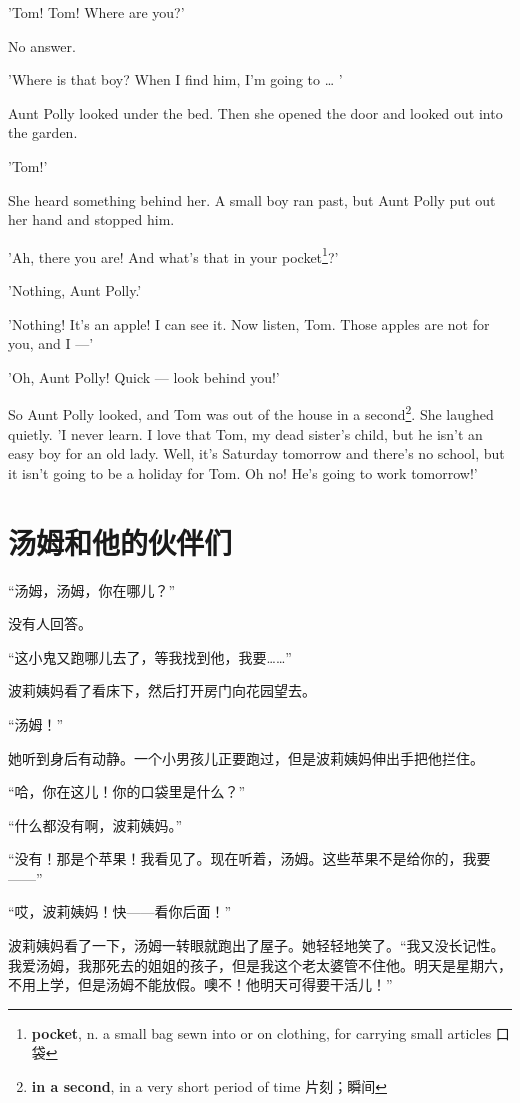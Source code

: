 \documentclass[fontset=ubuntu, zihao=5]{ctexart}
\begin{document}
\begin{paracol}{2}
'Tom! Tom! Where are you?'

No answer.

'Where is that boy? When I find him, I'm going to \ldots{} '

Aunt Polly looked under the bed. Then she opened the door and looked out into the garden.

'Tom!'

She heard something behind her. A small boy ran past, but Aunt Polly put out her hand and stopped him.

'Ah, there you are! And what's that in your pocket\footnote{\textbf{pocket}, n. a small bag sewn into or on clothing, for carrying small articles 口袋}?'

'Nothing, Aunt Polly.'

'Nothing! It's an apple! I can see it. Now listen, Tom. Those apples are not for you, and I —'

'Oh, Aunt Polly! Quick — look behind you!'

So Aunt Polly looked, and Tom was out of the house in a second\footnote{\textbf{in a
  second}, in a very short period of time 片刻；瞬间}. She laughed quietly. 'I
never learn. I love that Tom, my dead sister's child, but he isn't an easy
boy for an old lady. Well, it's Saturday tomorrow and there's no school, but
it isn't going to be a holiday for Tom. Oh no! He's going to work tomorrow!'

\switchcolumn

\section*{汤姆和他的伙伴们}

“汤姆，汤姆，你在哪儿？”

没有人回答。

“这小鬼又跑哪儿去了，等我找到他，我要……”

波莉姨妈看了看床下，然后打开房门向花园望去。

“汤姆！”

她听到身后有动静。一个小男孩儿正要跑过，但是波莉姨妈伸出手把他拦住。

“哈，你在这儿！你的口袋里是什么？”

“什么都没有啊，波莉姨妈。”

“没有！那是个苹果！我看见了。现在听着，汤姆。这些苹果不是给你的，我要——”

“哎，波莉姨妈！快——看你后面！”

波莉姨妈看了一下，汤姆一转眼就跑出了屋子。她轻轻地笑了。“我又没长记性。我爱汤姆，我那死去的姐姐的孩子，但是我这个老太婆管不住他。明天是星期六，不用上学，但是汤姆不能放假。噢不！他明天可得要干活儿！”


\end{paracol}
\end{document}
